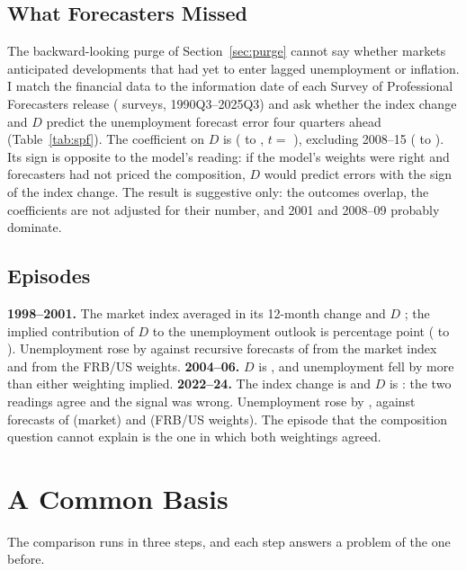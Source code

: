 \documentclass[11pt]{article}
\begin{document}
\subsection{What Forecasters Missed}\label{sec:spf}
The backward-looking purge of Section~\ref{sec:purge} cannot say whether markets anticipated developments that had yet to enter lagged unemployment or inflation. I match the financial data to the information date of each Survey of Professional Forecasters release ( surveys, 1990Q3--2025Q3) and ask whether the index change and $D$ predict the unemployment forecast error four quarters ahead (Table~\ref{tab:spf}). The coefficient on $D$ is  ( to , $t=$ ),  excluding 2008--15 ( to ). Its sign is opposite to the model's reading: if the model's weights were right and forecasters had not priced the composition, $D$ would predict errors with the sign of the index change. The result is suggestive only: the outcomes overlap, the coefficients are not adjusted for their number, and 2001 and 2008--09 probably dominate.



\subsection{Episodes}\label{sec:epi}
\textbf{1998--2001.} The market index averaged  in its 12-month change and $D$ ; the implied contribution of $D$ to the unemployment outlook is  percentage point ( to ). Unemployment rose by  against recursive forecasts of  from the market index and  from the FRB/US weights.
\textbf{2004--06.} $D$ is , and unemployment fell by more than either weighting implied.
\textbf{2022--24.} The index change is  and $D$ is : the two readings agree and the signal was wrong. Unemployment rose by , against forecasts of  (market) and  (FRB/US weights). The episode that the composition question cannot explain is the one in which both weightings agreed.
\FloatBarrier
\section{A Common Basis}\label{sec:steps}
The comparison runs in three steps, and each step answers a problem of the one before.
\end{document}

